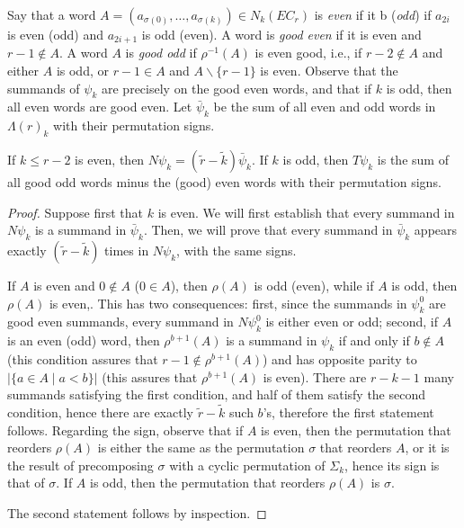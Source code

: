 Say that a word $A = (a_{\sigma(0)},\ldots,a_{\sigma(k)})\in N_k(EC_r)$ is \emph{even} if it b (\emph{odd}) if $a_{2i}$ is even (odd) and $a_{2i+1}$ is odd (even). A word is \emph{good even} if it is even and $r-1\notin A$. A word $A$ is \emph{good odd} if $\rho^{-1}(A)$ is even good, i.e., if $r-2\notin A$ and either $A$ is odd, or $r-1\in A$ and $A\smallsetminus \{r-1\}$ is even. Observe that the summands of $\psi_k$ are precisely on the good even words, and that if $k$ is odd, then all even words are good even. Let $\bar{\psi}_k$ be the sum of all even and odd words in $\Lambda(r)_k$ with their permutation signs.
\begin{lemma}\label{lemma:simp} If $k\leq r-2$ is even, then $N\psi_k = (\tilde{r}-\tilde{k})\bar{\psi}_k$. If $k$ is odd, then $T\psi_k$ is the sum of all good odd words minus the (good) even words with their permutation signs.
\end{lemma}
\begin{proof}
Suppose first that $k$ is even. We will first establish that every summand in $N\psi_k$ is a summand in $\bar{\psi}_k$. Then, we will prove that every summand in $\bar{\psi}_k$ appears exactly $(\tilde{r}-\tilde{k})$ times in $N\psi_k$, with the same signs.

If $A$ is even and $0\notin A$ ($0\in A$), then $\rho(A)$ is odd (even), while if $A$ is odd, then $\rho(A)$ is even,. This has two consequences: first, since the summands in $\psi_k^0$ are good even summands, every summand in $N\psi_k^0$ is either even or odd; second, if $A$ is an even (odd) word, then $\rho^{b+1}(A)$ is a summand in $\psi_k$ if and only if $b\notin A$ (this condition assures that $r-1\notin \rho^{b+1}(A)$) and has opposite parity to $|\{a\in A\mid a<b\}|$ (this assures that $\rho^{b+1}(A)$ is even). There are $r-k-1$ many summands satisfying the first condition, and half of them satisfy the second condition, hence there are exactly $\tilde{r}-\tilde{k}$ such $b$'s, therefore the first statement follows. Regarding the sign, observe that if $A$ is even, then the permutation that reorders $\rho(A)$ is either the same as the permutation $\sigma$ that reorders $A$, or it is the result of precomposing $\sigma$ with a cyclic permutation of $\Sigma_k$, hence its sign is that of $\sigma$. If $A$ is odd, then the permutation that reorders $\rho(A)$ is $\sigma$.

The second statement follows by inspection.
%
%
\end{proof}

